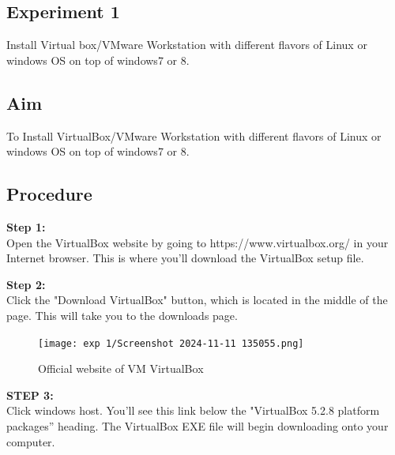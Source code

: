\documentclass[12pt]{article}
\begin{document}
\begin{spacing}{1.5}
\begin{adjustwidth}{0cm}{0cm}
\begin{justify}

\tableofcontents
\newpage
\listoffigures
\newpage


\newpage
\pagestyle{fancy}
\renewcommand{\headruleskip}{5mm}
\renewcommand{\footruleskip}{10pt}
\renewcommand{\headrulewidth}{2pt}
\renewcommand{\footrulewidth}{4pt}
\fancyhead{}
\fancyfoot{} %
\fancyfoot[LE,RO]{\thepage}


\newpage
\section{Experiment 1}
Install Virtual box/VMware Workstation with different flavors of Linux or windows OS on top of windows7 or 8.
\subsection{Aim}
To Install VirtualBox/VMware Workstation with different flavors of Linux or windows OS on top of windows7 or 8.
\subsection{Procedure}

\textbf{Step 1:} \\
Open the VirtualBox website by going to https://www.virtualbox.org/ in your Internet browser. This is where you’ll download the VirtualBox setup file.

\textbf{Step 2:} \\
Click the "Download VirtualBox" button, which is located in the middle of the page. This will take you to the downloads page.

\begin{figure}[H]
    \centering
    \texttt{[image: exp 1/Screenshot 2024-11-11 135055.png]}
    \caption{Official website of VM VirtualBox}
    \label{fig: 1}
\end{figure}

\textbf{STEP 3:} \\
Click windows host. You'll see this link below the "VirtualBox 5.2.8 platform packages” heading. The VirtualBox EXE file will begin downloading onto your computer.


\end{justify}
\end{adjustwidth}
\end{spacing}
\end{document}
